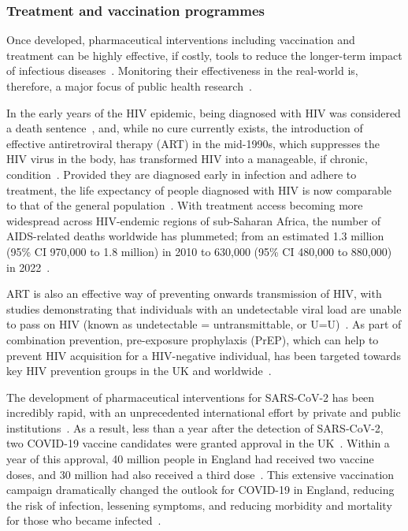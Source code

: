 \subsubsection{Treatment and vaccination programmes}

Once developed, pharmaceutical interventions including vaccination and treatment can be highly effective, if costly, tools to reduce the longer-term impact of infectious diseases~\parencite{Schrappe1998-py}. Monitoring their effectiveness in the real-world is, therefore, a major focus of public health research~\parencite{UK_Health_Security_Agency2021-gw}.

In the early years of the HIV epidemic, being diagnosed with HIV was considered a death sentence~\parencite{Rothenberg1987-hs,Pezzotti2003-kp,Collaborative_Group_on_AIDS_Incubation_and_HIV_Survival2000-wg}, and, while no cure currently exists, the introduction of effective antiretroviral therapy (ART) in the mid-1990s, which suppresses the HIV virus in the body, has transformed HIV into a manageable, if chronic, condition~\parencite{Deeks2013-kl}. Provided they are diagnosed early in infection and adhere to treatment, the life expectancy of people diagnosed with HIV is now comparable to that of the general population~\parencite{Nakagawa2013-wa}. With treatment access becoming more widespread across HIV-endemic regions of sub-Saharan Africa, the number of AIDS-related deaths worldwide has plummeted; from an estimated 1.3 million (95\% CI 970,000 to 1.8 million) in 2010 to 630,000 (95\% CI 480,000 to 880,000) in 2022~\parencite{Joint_United_Nations_Programme_on_HIVAIDS_UNAIDS2023-sl}.

ART is also an effective way of preventing onwards transmission of HIV, with studies demonstrating that individuals with an undetectable viral load are unable to pass on HIV (known as undetectable = untransmittable, or U=U)~\parencite{World_Health_Organization2023-xi, Cohen2016-wy}. As part of combination prevention, pre-exposure prophylaxis (PrEP), which can help to prevent HIV acquisition for a HIV-negative individual, has been targeted towards key HIV prevention groups in the UK and worldwide~\parencite{Brown2017-yu, Rivet-Amico2019-di}.

The development of pharmaceutical interventions for SARS-CoV-2 has been incredibly rapid, with an unprecedented international effort by private and public institutions~\parencite{Krammer2020-yo}. As a result, less than a year after the detection of SARS-CoV-2, two COVID-19 vaccine candidates were granted approval in the UK~\parencite{Sharma2020-jt, Medicines_and_Healthcare_products_Regulatory_Agency2020-jn}. Within a year of this approval, 40 million people in England had received two vaccine doses, and 30 million had also received a third dose~\parencite{UK_Government2021-ip}. This extensive vaccination campaign dramatically changed the outlook for COVID-19 in England, reducing the risk of infection, lessening symptoms, and reducing morbidity and mortality for those who became infected~\parencite{Lopez_Bernal2021-gt, Public_Health_England2021-xs, Hall2021-si}.

